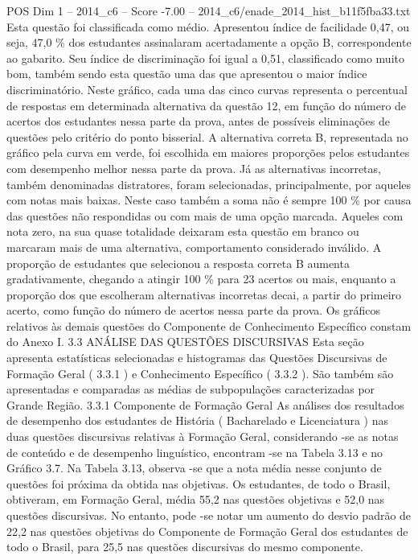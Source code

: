 \begin{textsample}{POS Dim 1 – 2014\_c6 – Score -7.00 – 2014\_c6/enade\_2014\_hist\_b11f5fba33.txt}
Esta questão foi classificada como médio.
Apresentou índice de facilidade 0,47, ou seja, 47,0 \% dos estudantes assinalaram acertadamente a opção B, correspondente ao gabarito.
Seu índice de discriminação foi igual a 0,51, classificado como muito bom, também sendo esta questão uma das que apresentou o maior índice discriminatório.
Neste gráfico, cada uma das cinco curvas representa o percentual de respostas em determinada alternativa da questão 12, em função do número de acertos dos estudantes nessa parte da prova, antes de possíveis eliminações de questões pelo critério do ponto bisserial.
A alternativa correta B, representada no gráfico pela curva em verde, foi escolhida em maiores proporções pelos estudantes com desempenho melhor nessa parte da prova.
Já as alternativas incorretas, também denominadas distratores, foram selecionadas, principalmente, por aqueles com notas mais baixas.
Neste caso também a soma não é sempre 100 \% por causa das questões não respondidas ou com mais de uma opção marcada.
Aqueles com nota zero, na sua quase totalidade deixaram esta questão em branco ou marcaram mais de uma alternativa, comportamento considerado inválido.
A proporção de estudantes que selecionou a resposta correta B aumenta gradativamente, chegando a atingir 100 \% para 23 acertos ou mais, enquanto a proporção dos que escolheram alternativas incorretas decai, a partir do primeiro acerto, como função do número de acertos nessa parte da prova.
Os gráficos relativos às demais questões do Componente de Conhecimento Específico constam do Anexo I. 3.3 ANÁLISE DAS QUESTÕES DISCURSIVAS Esta seção apresenta estatísticas selecionadas e histogramas das Questões Discursivas de Formação Geral ( 3.3.1 ) e Conhecimento Específico ( 3.3.2 ).
São também são apresentadas e comparadas as médias de subpopulações caracterizadas por Grande Região. 3.3.1 Componente de Formação Geral As análises dos resultados de desempenho dos estudantes de História ( Bacharelado e Licenciatura ) nas duas questões discursivas relativas à Formação Geral, considerando -se as notas de conteúdo e de desempenho linguístico, encontram -se na Tabela 3.13 e no Gráfico 3.7.
Na Tabela 3.13, observa -se que a nota média nesse conjunto de questões foi próxima da obtida nas objetivas.
Os estudantes, de todo o Brasil, obtiveram, em Formação Geral, média 55,2 nas questões objetivas e 52,0 nas questões discursivas.
No entanto, pode -se notar um aumento do desvio padrão de 22,2 nas questões objetivas do Componente de Formação Geral dos estudantes de todo o Brasil, para 25,5 nas questões discursivas do mesmo componente.

\end{textsample}
